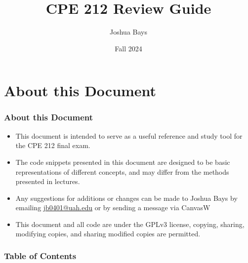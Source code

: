 \documentclass[c, aspectratio=169]{beamer}
\title{CPE 212 Review Guide}
\author{Joshua Bays}\date{Fall 2024}
\institute{Univeristy of Alabama in Huntsville}
\begin{document}
\begin{frame}
\titlepage
\end{frame}

\section*{About this Document}
\begin{frame}\frametitle{About this Document}
\begin{itemize}
\item This document is intended to serve as a useful reference and study tool for the CPE 212 final exam.
\item The code snippets presented in this document are designed to be basic representations of different concepts, and may differ from the methods presented in lectures.
\item Any suggestions for additions or changes can be made to Joshua Bays by emailing \href{mailto:jb0401@uah.edu}{jb0401@uah.edu} or by sending a message via CanvasW
\item This document and all code are under the GPLv3 license, copying, sharing, modifying copies, and sharing modified copies are permitted.
\end{itemize}
\end{frame}

\begin{frame}\frametitle{Table of Contents}
\begin{multicols}{2}
\tableofcontents
\end{multicols}
\end{frame}
\end{document}
